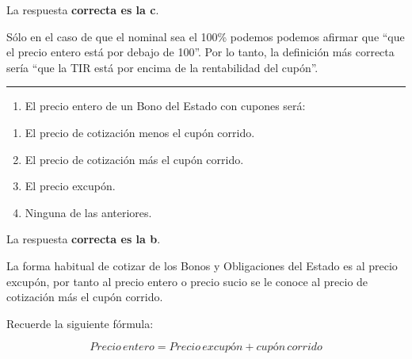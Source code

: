 \documentclass[
  letterpaper,
  DIV=11,
  numbers=noendperiod]{scrreprt}
\providecommand{\tightlist}{%
  \setlength{\itemsep}{0pt}\setlength{\parskip}{0pt}}\usepackage{longtable,booktabs,array}
\begin{document}
\begin{tcolorbox}[enhanced jigsaw, left=2mm, opacityback=0, colback=white, breakable, arc=.35mm, bottomrule=.15mm, rightrule=.15mm, toprule=.15mm, leftrule=.75mm, colframe=quarto-callout-tip-color-frame]
\begin{minipage}[t]{5.5mm}
\textcolor{quarto-callout-tip-color}{\faLightbulb}
\end{minipage}%
\begin{minipage}[t]{\textwidth - 5.5mm}

La respuesta \textbf{correcta es la c}.

Sólo en el caso de que el nominal sea el 100\% podemos podemos afirmar
que ``que el precio entero está por debajo de 100''. Por lo tanto, la
definición más correcta sería ``que la TIR está por encima de la
rentabilidad del cupón''.

\end{minipage}%
\end{tcolorbox}

\begin{center}\rule{0.5\linewidth}{0.5pt}\end{center}

\begin{enumerate}
\def\labelenumi{\arabic{enumi}.}
\setcounter{enumi}{15}
\tightlist
\item
  El precio entero de un Bono del Estado con cupones será:
\end{enumerate}

\begin{enumerate}
\def\labelenumi{\alph{enumi}.}
\item
  El precio de cotización menos el cupón corrido.
\item
  El precio de cotización más el cupón corrido.
\item
  El precio excupón.
\item
  Ninguna de las anteriores.
\end{enumerate}

\begin{tcolorbox}[enhanced jigsaw, left=2mm, opacityback=0, colback=white, breakable, arc=.35mm, bottomrule=.15mm, rightrule=.15mm, toprule=.15mm, leftrule=.75mm, colframe=quarto-callout-tip-color-frame]
\begin{minipage}[t]{5.5mm}
\textcolor{quarto-callout-tip-color}{\faLightbulb}
\end{minipage}%
\begin{minipage}[t]{\textwidth - 5.5mm}

La respuesta \textbf{correcta es la b}.

La forma habitual de cotizar de los Bonos y Obligaciones del Estado es
al precio excupón, por tanto al precio entero o precio sucio se le
conoce al precio de cotización más el cupón corrido.

Recuerde la siguiente fórmula:

\[Precio\,entero = Precio\,excupón + cupón\,corrido\]

\end{minipage}%
\end{tcolorbox}
\end{document}
